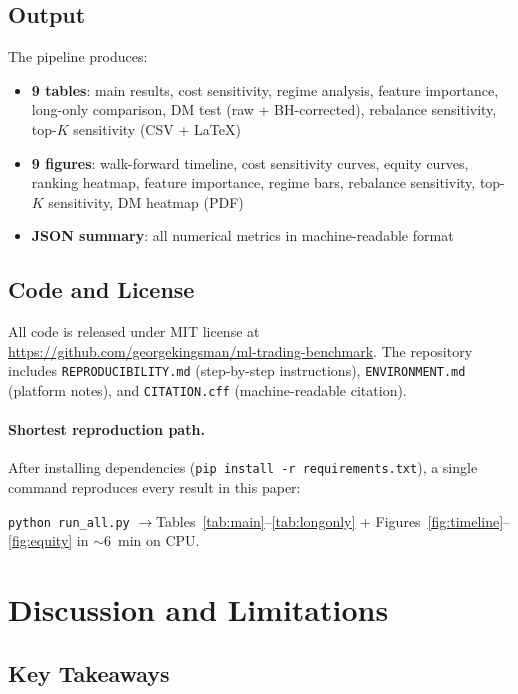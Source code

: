 \documentclass[11pt]{article}
\begin{document}
\subsection{Output}

The pipeline produces:
\begin{itemize}[leftmargin=1.4em]
  \item \textbf{9 tables}: main results, cost sensitivity, regime analysis, feature importance, long-only comparison, DM test (raw + BH-corrected), rebalance sensitivity, top-$K$ sensitivity (CSV + \LaTeX)
  \item \textbf{9 figures}: walk-forward timeline, cost sensitivity curves, equity curves, ranking heatmap, feature importance, regime bars, rebalance sensitivity, top-$K$ sensitivity, DM heatmap (PDF)
  \item \textbf{JSON summary}: all numerical metrics in machine-readable format
\end{itemize}

\subsection{Code and License}

All code is released under MIT license at \url{https://github.com/georgekingsman/ml-trading-benchmark}.
The repository includes \texttt{REPRODUCIBILITY.md} (step-by-step instructions), \texttt{ENVIRONMENT.md} (platform notes), and \texttt{CITATION.cff} (machine-readable citation).

\paragraph{Shortest reproduction path.}
After installing dependencies (\texttt{pip install -r requirements.txt}), a single command reproduces every result in this paper:
\begin{center}
\texttt{python run\_all.py} \quad$\longrightarrow$\quad Tables~\ref{tab:main}--\ref{tab:longonly} + Figures~\ref{fig:timeline}--\ref{fig:equity} in {$\sim$6~min} on CPU.
\end{center}


\section{Discussion and Limitations}
\label{sec:discussion}

\subsection{Key Takeaways}
\end{document}
